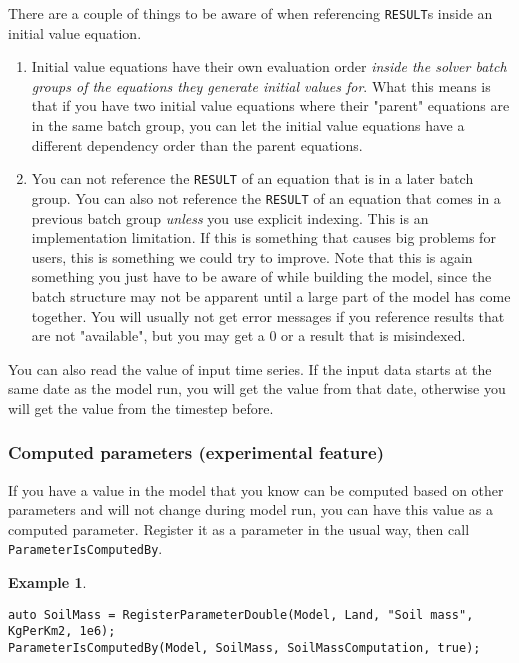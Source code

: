 \documentclass[11pt]{article}
\theoremstyle{definition}
\newtheorem{myexample}{Example}
\newenvironment{example}%
  {\begin{lrbox}{\examplebox}%
   \begin{minipage}{\dimexpr\linewidth-2\fboxsep}
   \begin{myexample}}%
  {\end{myexample}%
   \end{minipage}%
   \end{lrbox}%
   \begin{trivlist}
     \item[]\colorbox{silver}{\usebox\examplebox}
   \end{trivlist}}
\begin{document}
There are a couple of things to be aware of when referencing {\tt RESULT}s inside an initial value equation.
\begin{enumerate}[i]
\item Initial value equations have their own evaluation order \emph{inside the solver batch groups of the equations they generate initial values for}. What this means is that if you have two initial value equations where their "parent" equations are in the same batch group, you can let the initial value equations have a different dependency order than the parent equations.
\item You can not reference the {\tt RESULT} of an equation that is in a later batch group. You can also not reference the {\tt RESULT} of an equation that comes in a previous batch group \emph{unless} you use explicit indexing. This is an implementation limitation. If this is something that causes big problems for users, this is something we could try to improve. Note that this is again something you just have to be aware of while building the model, since the batch structure may not be apparent until a large part of the model has come together. You will usually not get error messages if you reference results that are not "available", but you may get a 0 or a result that is misindexed.
\end{enumerate}

You can also read the value of input time series. If the input data starts at the same date as the model run, you will get the value from that date, otherwise you will get the value from the timestep before.

\subsubsection{Computed parameters (experimental feature)}

If you have a value in the model that you know can be computed based on other parameters and will not change during model run, you can have this value as a computed parameter. Register it as a parameter in the usual way, then call {\tt ParameterIsComputedBy}.

\begin{example}
\begin{lstlisting}[style=mycpp]
auto SoilMass = RegisterParameterDouble(Model, Land, "Soil mass", KgPerKm2, 1e6);
ParameterIsComputedBy(Model, SoilMass, SoilMassComputation, true);
\end{lstlisting}
\end{example}
\end{document}
